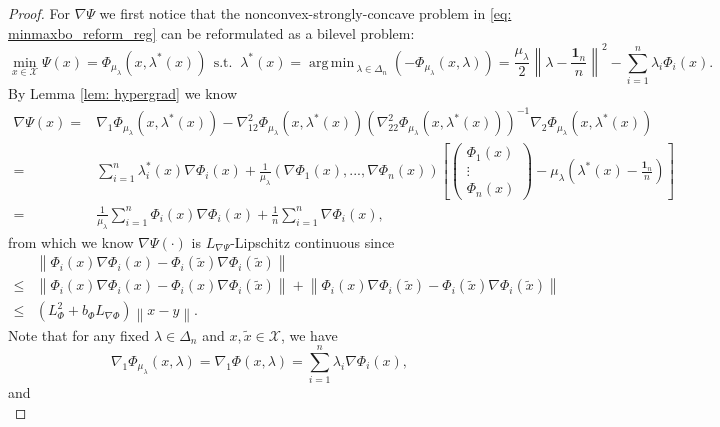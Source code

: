 \documentclass[10pt]{article}
\theoremstyle{remark}
\newcommand{\cX}{\mathcal{X}}
\newcommand{\norm}[1]{\left\|#1\right\|}
\newcommand{\bfone}{\mathbf{1}}
\DeclareMathOperator*{\argmin}{arg\,min\,}
\begin{document}
\begin{proof}
    For $\nabla\Psi$ we first notice that the nonconvex-strongly-concave problem in \eqref{eq: minmaxbo_reform_reg} can be reformulated as a bilevel problem:
    \[
        \min_{x\in \cX}\Psi(x) = \Phi_{\mu_{\lambda}}(x, \lambda^*(x))\ \ \text{s.t. }\ \lambda^*(x) = \argmin_{\lambda\in \Delta_n}\left(-\Phi_{\mu_{\lambda}}(x,\lambda)\right) = \frac{\mu_{\lambda}}{2}\norm{\lambda - \frac{\bfone_n}{n}}^2 - \sum_{i=1}^{n}\lambda_i\Phi_i(x).
    \]
    By Lemma \ref{lem: hypergrad} we know
    \begin{align*}
        \nabla \Psi(x) = &\nabla_1\Phi_{\mu_{\lambda}}(x,\lambda^*(x)) - \nabla_{12}^2\Phi_{\mu_{\lambda}}(x,\lambda^*(x))\left(\nabla_{22}^2\Phi_{\mu_{\lambda}}(x,\lambda^*(x))\right)^{-1}\nabla_2\Phi_{\mu_{\lambda}}(x,\lambda^*(x)) \\
        =&\sum_{i=1}^{n}\lambda_i^*(x)\nabla\Phi_i(x) + \frac{1}{\mu_{\lambda}} \left(\nabla\Phi_1(x), ..., \nabla\Phi_n(x)\right)\left[ \begin{pmatrix}
            \Phi_1(x) \\
            \vdots \\
            \Phi_n(x)
        \end{pmatrix} - \mu_{\lambda}\left(\lambda^*(x) - \frac{\bfone_n}{n}\right)\right] \\
        = & \frac{1}{\mu_{\lambda}}\sum_{i=1}^{n}\Phi_i(x)\nabla\Phi_i(x) + \frac{1}{n}\sum_{i=1}^{n}\nabla\Phi_i(x),
    \end{align*}
    from which we know $\nabla\Psi(\cdot)$ is $L_{\nabla\Psi}$-Lipschitz continuous since 
    \begin{align*}
        &\norm{\Phi_i(x)\nabla\Phi_i(x) - \Phi_i(\tilde x)\nabla\Phi_i(\tilde x)} \\
        \leq &\norm{\Phi_i(x)\nabla\Phi_i(x) - \Phi_i(x)\nabla\Phi_i(\tilde x)} + \norm{\Phi_i(x)\nabla\Phi_i(\tilde x) - \Phi_i(\tilde x)\nabla\Phi_i(\tilde x)} \\
        \leq &\left(L_{\Phi}^2 + b_{\Phi}L_{\nabla\Phi}\right)\norm{x-y}.
    \end{align*}
    Note that for any fixed $\lambda \in \Delta_n$ and $x, \tilde x\in\cX$, we have
    \begin{equation}\label{eq: phi_mu_and_phi}
        \nabla_1\Phi_{\mu_{\lambda}}(x,\lambda) = \nabla_1\Phi(x,\lambda) = \sum_{i=1}^{n}\lambda_i\nabla\Phi_i(x),
    \end{equation}
    and 
    \begin{equation}\label{ineq: nabla_1_phi_mu_lip}

\end{equation}
\end{proof}
\end{document}
